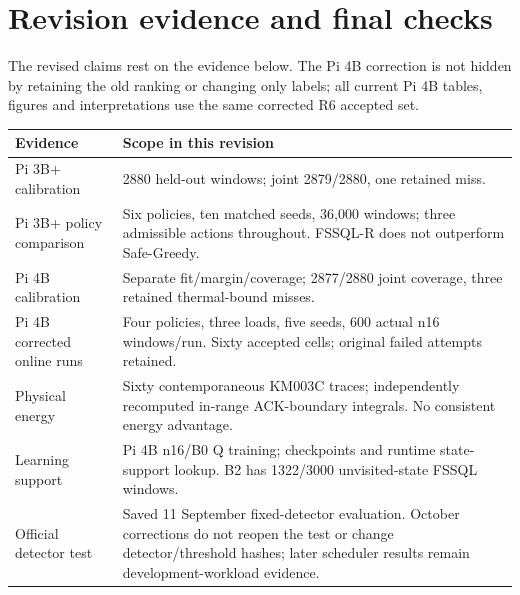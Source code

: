 \documentclass[10pt,a4paper]{article}
\begin{document}
\clearpage
\section*{Revision evidence and final checks}

\begin{authorresponsebox}
The revised claims rest on the evidence below. The Pi 4B correction is not hidden by retaining the old ranking or changing only labels; all current Pi 4B tables, figures and interpretations use the same corrected R6 accepted set.
\end{authorresponsebox}
\begin{center}\small
\begin{tabularx}{\textwidth}{@{}p{3.4cm}X@{}}\toprule
Evidence & Scope in this revision \\\midrule
Pi 3B+ calibration & 2880 held-out windows; joint 2879/2880, one retained miss. \\
Pi 3B+ policy comparison & Six policies, ten matched seeds, 36,000 windows; three admissible actions throughout. FSSQL-R does not outperform Safe-Greedy. \\
Pi 4B calibration & Separate fit/margin/coverage; 2877/2880 joint coverage, three retained thermal-bound misses. \\
Pi 4B corrected online runs & Four policies, three loads, five seeds, 600 actual n16 windows/run. Sixty accepted cells; original failed attempts retained. \\
Physical energy & Sixty contemporaneous KM003C traces; independently recomputed in-range ACK-boundary integrals. No consistent energy advantage. \\
Learning support & Pi 4B n16/B0 Q training; checkpoints and runtime state-support lookup. B2 has 1322/3000 unvisited-state FSSQL windows. \\
Official detector test & Saved 11 September fixed-detector evaluation. October corrections do not reopen the test or change detector/threshold hashes; later scheduler results remain development-workload evidence. \\
\bottomrule\end{tabularx}
\end{center}
\end{document}
